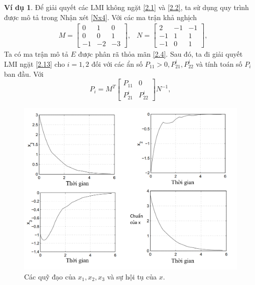 \documentclass[12pt,a4paper]{report}
\theoremstyle{definition}
\newtheorem{vd}{Ví dụ}
\theoremstyle{definition}
\numberwithin{dl}{chapter}
\numberwithin{vd}{chapter}
\numberwithin{corollary}{chapter}
\numberwithin{lemma}{chapter}
\numberwithin{md}{chapter}
\numberwithin{dn}{chapter}
\numberwithin{cy}{chapter}
\numberwithin{nx}{chapter}
\begin{document}
\begin{vd}
Để giải quyết các LMI không ngặt \eqref{2.1} và \eqref{2.2}, ta sử dụng quy trình được mô tả trong Nhận xét \ref{Nx4}. Với các ma trận khả nghịch
\begin{equation}\label{2.63}
\begin{aligned}
&M=\left[\begin{array}{rrr}
0 & 1 & 0 \\
0 & 0 & 1 \\
-1 & -2 & -3
\end{array}\right], 
&N=\left[\begin{array}{rrr}
2 & -1 & -1 \\
-1 & 1 & 1 \\
-1 & 0 & 1
\end{array}\right],
\end{aligned}
\end{equation}
Ta có ma trận mô tả $E$ được phân rã thỏa mãn \eqref{2.4}. Sau đó, ta đi giải quyết LMI  ngặt \eqref{2.13} cho $i=1,2$ đối với các ẩn số $P_{11}>0, P_{21}^{i}, P_{22}^{i}$ và tính toán số $P_{i}$ ban đầu.
Với
$$
P_{i}=M^{T}\left[\begin{array}{cc}
P_{11} & 0 \\
P_{21}^{i} & P_{22}^{i}
\end{array}\right] N^{-1}, 
$$
\begin{figure}[h!]
	\centering
	\includegraphics[width=1.0\linewidth]{Ảnh_LV.png}
	\caption{Các quỹ đạo của $x_{1}, x_{2}, x_{3}$ và sự hội tụ của $x$.\\}
\end{figure}


\end{vd}
\end{document}
